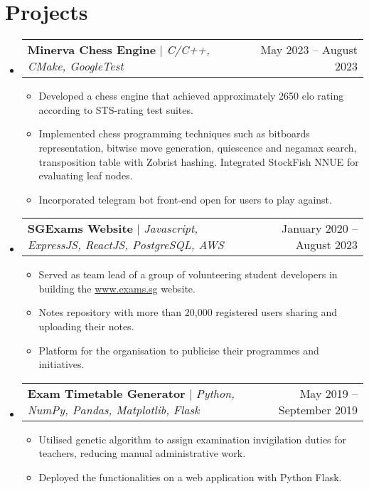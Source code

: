\documentclass[letterpaper,11pt]{article}
\makeatletter
\newcommand{\resumeItem}[1]{
  \item\footnotesize{
    {#1 \vspace{-2pt}}
  }
}
\newcommand{\resumeProjectHeading}[2]{
    \item
    \begin{tabular*}{0.97\textwidth}{l@{\extracolsep{\fill}}r}
      \small#1 & #2 \\
    \end{tabular*}\vspace{-6pt}
}
\newcommand{\resumeSubHeadingListStart}{\begin{itemize}[leftmargin=0.15in, label={}]}
\newcommand{\resumeSubHeadingListEnd}{\end{itemize}}
\newcommand{\resumeItemListStart}{\begin{itemize}}
\newcommand{\resumeItemListEnd}{\end{itemize}\vspace{-7pt}}
\makeatother
\begin{document}
\section{Projects}
    \resumeSubHeadingListStart
      \resumeProjectHeading
          {\textbf{Minerva Chess Engine} $|$ \emph{C/C++, CMake, GoogleTest}}{May 2023 -- August 2023}
          \resumeItemListStart
            \resumeItem{Developed a chess engine that achieved approximately 2650 elo rating according to STS-rating test suites.}
            \resumeItem{Implemented chess programming techniques such as bitboards representation, bitwise move generation, quiescence and negamax search, transposition table with Zobrist hashing. Integrated StockFish NNUE for evaluating leaf nodes.}
            \resumeItem{Incorporated telegram bot front-end open for users to play against.}
          \resumeItemListEnd
      \resumeProjectHeading
          {\textbf{SGExams Website} $|$ \emph{Javascript, ExpressJS, ReactJS, PostgreSQL, AWS}}{January 2020 -- August 2023}
          \resumeItemListStart
            \resumeItem{Served as team lead of a group of volunteering student developers in building the \href{https://www.exams.sg}{www.exams.sg} website.}
            \resumeItem{Notes repository with more than 20,000 registered users sharing and uploading their notes.}
            \resumeItem{Platform for the organisation to publicise their programmes and initiatives.}
          \resumeItemListEnd
      \resumeProjectHeading
          {\textbf{Exam Timetable Generator} $|$ \emph{Python, NumPy, Pandas, Matplotlib, Flask}}{May 2019 -- September 2019}
          \resumeItemListStart
            \resumeItem{Utilised genetic algorithm to assign examination invigilation duties for teachers, reducing manual administrative work.}
            \resumeItem{Deployed the functionalities on a web application with Python Flask.}
          \resumeItemListEnd
    \resumeSubHeadingListEnd


\end{document}

